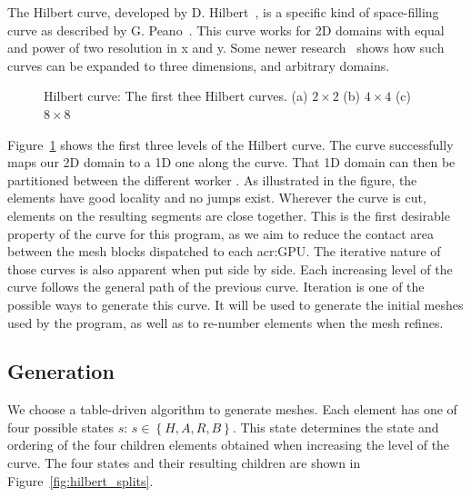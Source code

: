 The Hilbert curve, developed by D. Hilbert~\cite{Hilbert1891}, is a specific kind of space-filling
curve as described by G. Peano~\cite{Peano1890}. This curve works for 2D domains with equal and
power of two resolution in x and y. Some newer research~\cite{Haverkort2011} shows how such curves
can be expanded to three dimensions, and arbitrary domains.

\begin{figure}[H]
    \centering
    \hfill
    \hfill
    \caption{Hilbert curve: The first thee Hilbert curves. (a) \(2\times2\) (b) \(4\times4\) (c) \(8\times8\)}\label{fig:hilbert_curves}
\end{figure}

Figure~\ref{fig:hilbert_curves} shows the first three levels of the Hilbert curve. The curve
successfully maps our 2D domain to a 1D one along the curve. That 1D domain can then be partitioned
between the different worker . As illustrated in the figure, the elements have
good locality and no jumps exist. Wherever the curve is cut, elements on the resulting segments are
close together. This is the first desirable property of the curve for this program, as we aim to
reduce the contact area between the mesh blocks dispatched to each \acrshort{acr:GPU}. The iterative
nature of those curves is also apparent when put side by side. Each increasing level of the curve
follows the general path of the previous curve. Iteration is one of the possible ways to generate
this curve. It will be used to generate the initial meshes used by the program, as well as to
re-number elements when the mesh refines.

\subsection{Generation}\label{subsection:load_balancing:hilbert_curve:generation}

We choose a table-driven algorithm to generate meshes. Each element has one of four possible states
\(s\): \(s \in \left \{H, A, R, B \right \} \). This state determines the state and ordering of the
four children elements obtained when increasing the level of the curve. The four states and their
resulting children are shown in Figure~\ref{fig:hilbert_splits}.

